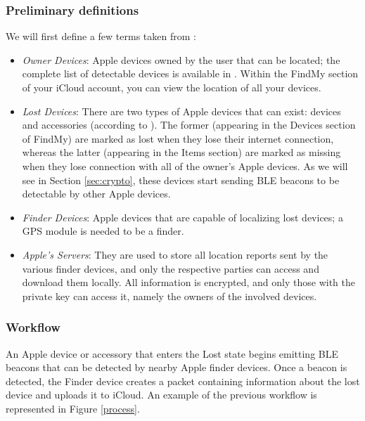 \documentclass[english]{article}
\begin{document}
\subsubsection{Preliminary definitions}
We will first define a few terms taken from \cite{whocanfind}:
\begin{itemize}
  \item \textit{Owner Devices}: Apple devices owned by the user that can be located; the complete list of detectable devices is available in \cite{Apple}. Within the FindMy section of your iCloud account, you can view the location of all your devices.
  \item \textit{Lost Devices}: There are two types of Apple devices that can exist: devices and accessories (according to \cite{whocanfind}). The former (appearing in the Devices section of FindMy) are marked as lost when they lose their internet connection, whereas the latter (appearing in the Items section) are marked as missing when they lose connection with all of the owner's Apple devices. As we will see in Section \ref{sec:crypto}, these devices start sending BLE beacons to be detectable by other Apple devices.
  \item \textit{Finder Devices}: Apple devices that are capable of localizing lost devices; a GPS module is needed to be a finder.
  \item \textit{Apple’s Servers}: They are used to store all location reports sent by the various finder devices, and only the respective parties can access and download them locally. All information is encrypted, and only those with the private key can access it, namely the owners of the involved devices.
\end{itemize}
\subsubsection{Workflow}
An Apple device or accessory that enters the Lost state begins emitting BLE beacons that can be detected by nearby Apple finder devices. Once a beacon is detected, the Finder device creates a packet containing information about the lost device and uploads it to iCloud. An example of the previous workflow is represented in Figure \ref{process}.
\end{document}
